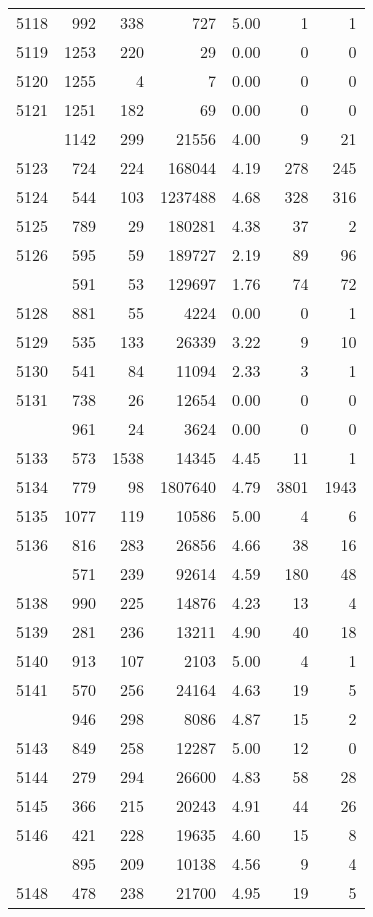 \documentclass[
]{article}
\begin{document}
\begin{table}
\begin{tabular}[t]{lrrrrrr}
5118 & 992 & 338 & 727 & 5.00 & 1 & 1\\
5119 & 1253 & 220 & 29 & 0.00 & 0 & 0\\
5120 & 1255 & 4 & 7 & 0.00 & 0 & 0\\
5121 & 1251 & 182 & 69 & 0.00 & 0 & 0\\
\addlinespace
5122 & 1142 & 299 & 21556 & 4.00 & 9 & 21\\
5123 & 724 & 224 & 168044 & 4.19 & 278 & 245\\
5124 & 544 & 103 & 1237488 & 4.68 & 328 & 316\\
5125 & 789 & 29 & 180281 & 4.38 & 37 & 2\\
5126 & 595 & 59 & 189727 & 2.19 & 89 & 96\\
\addlinespace
5127 & 591 & 53 & 129697 & 1.76 & 74 & 72\\
5128 & 881 & 55 & 4224 & 0.00 & 0 & 1\\
5129 & 535 & 133 & 26339 & 3.22 & 9 & 10\\
5130 & 541 & 84 & 11094 & 2.33 & 3 & 1\\
5131 & 738 & 26 & 12654 & 0.00 & 0 & 0\\
\addlinespace
5132 & 961 & 24 & 3624 & 0.00 & 0 & 0\\
5133 & 573 & 1538 & 14345 & 4.45 & 11 & 1\\
5134 & 779 & 98 & 1807640 & 4.79 & 3801 & 1943\\
5135 & 1077 & 119 & 10586 & 5.00 & 4 & 6\\
5136 & 816 & 283 & 26856 & 4.66 & 38 & 16\\
\addlinespace
5137 & 571 & 239 & 92614 & 4.59 & 180 & 48\\
5138 & 990 & 225 & 14876 & 4.23 & 13 & 4\\
5139 & 281 & 236 & 13211 & 4.90 & 40 & 18\\
5140 & 913 & 107 & 2103 & 5.00 & 4 & 1\\
5141 & 570 & 256 & 24164 & 4.63 & 19 & 5\\
\addlinespace
5142 & 946 & 298 & 8086 & 4.87 & 15 & 2\\
5143 & 849 & 258 & 12287 & 5.00 & 12 & 0\\
5144 & 279 & 294 & 26600 & 4.83 & 58 & 28\\
5145 & 366 & 215 & 20243 & 4.91 & 44 & 26\\
5146 & 421 & 228 & 19635 & 4.60 & 15 & 8\\
\addlinespace
5147 & 895 & 209 & 10138 & 4.56 & 9 & 4\\
5148 & 478 & 238 & 21700 & 4.95 & 19 & 5\\

\end{tabular}
\end{table}
\end{document}
